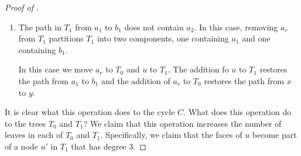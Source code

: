\documentclass{patmorin}
\newcommand{\dual}[1]{{#1}^\star}
\begin{document}
\begin{proof}[Proof of ]
\begin{enumerate}
the edges of every keeper path are contained in the boundary of exactly one or two pinched faces.
     


To see why this is so, consider some keeper
     path $P$ for $C$.  The path $P$ is a keeper because some face $f$
     of $\dual{T}$ that contains $P$ is pinched by $C$ and there is no
     face $g$ of $\dual{T}$ that is pinched by $C$ and contains some, but not all of $P$.  

     Each node of $T_0$ has a boundary made up alternating portions of
     $C$ and keeper paths.  A keeper path is a keeper because it is on the boundary of a pinched node

     For two nodes $u$ and $w$ of $T_0$ that 


     If $P$ is not a keeper path for $C'$, then there are one of two reasons:
     \begin{enumerate}
         \item $f$ is not pinched by $C'$; or
         \item some face $f'$ that contains some, but not all of $P$, is pinched by $C'$.
     \end{enumerate}
     The only places where the latter is in danger of happening are at the keeper path on the boundary of $a_k$ and $a_{k+1}$


and contains $P$it is completely contained in the boundary of a single pinched face $f_1$ and possibly also completely contained in the boundary of another pinched face $f_2$.


, there is a single node
     $u'$ in $T_1'$ that contains $u$, $a_2,\ldots,a_r$ and
     $b_1,\ldots,b_s$.  Recall that, by  there is a single face $f$ of $\dual{T}$ contained in $u$ that has all edges of $u\cap C$
     on its boundary.  This face $f$ is pinched by $C'$


   \item The path in $T_1$ from $a_1$ to $b_1$ does not contain $a_2$.
     In this case, removing $a_r$ from $T_1$ partitions $T_1$ into two
     components, one containing $a_1$ and one containing $b_1$.

     In this case we move $a_r$ to $T_0$ and $u$ to $T_1$. The addition fo
     $u$ to $T_1$ restores the path from $a_1$ to $b_1$ and the addition
     of $a_r$ to $T_0$ restores the path from $x$ to $y$.
\end{enumerate}

It is clear what this operation does to the cycle $C$.  What does
this operation do to the trees $T_0$ and $T_1$?  We claim that this
operation increases the number of leaves in each of $T_0$ and $T_1$.
Specifically, we claim that the faces of $u$ become part of a node $u'$
in $T_1$ that has degree 3.


\end{proof}
\end{document}

